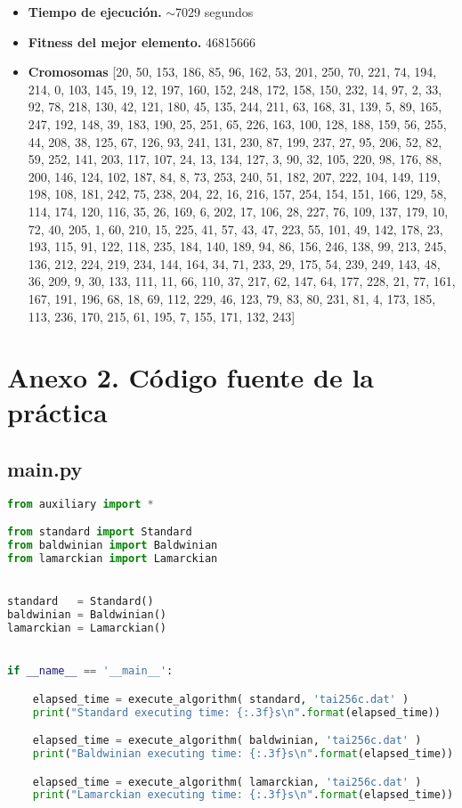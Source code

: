 \begin{itemize}
	\item \textbf{Tiempo de ejecución.} $\sim$7029 segundos
	\item \textbf{Fitness del mejor elemento.} 46815666
	\item \textbf{Cromosomas} [20, 50, 153, 186, 85, 96, 162, 53, 201, 250, 70, 221, 74, 194, 214, 0, 103, 145, 19, 12, 197, 160, 152, 248, 172, 158, 150, 232, 14, 97, 2, 33, 92, 78, 218, 130, 42, 121, 180, 45, 135, 244, 211, 63, 168, 31, 139, 5, 89, 165, 247, 192, 148, 39, 183, 190, 25, 251, 65, 226, 163, 100, 128, 188, 159, 56, 255, 44, 208, 38, 125, 67, 126, 93, 241, 131, 230, 87, 199, 237, 27, 95, 206, 52, 82, 59, 252, 141, 203, 117, 107, 24, 13, 134, 127, 3, 90, 32, 105, 220, 98, 176, 88, 200, 146, 124, 102, 187, 84, 8, 73, 253, 240, 51, 182, 207, 222, 104, 149, 119, 198, 108, 181, 242, 75, 238, 204, 22, 16, 216, 157, 254, 154, 151, 166, 129, 58, 114, 174, 120, 116, 35, 26, 169, 6, 202, 17, 106, 28, 227, 76, 109, 137, 179, 10, 72, 40, 205, 1, 60, 210, 15, 225, 41, 57, 43, 47, 223, 55, 101, 49, 142, 178, 23, 193, 115, 91, 122, 118, 235, 184, 140, 189, 94, 86, 156, 246, 138, 99, 213, 245, 136, 212, 224, 219, 234, 144, 164, 34, 71, 233, 29, 175, 54, 239, 249, 143, 48, 36, 209, 9, 30, 133, 111, 11, 66, 110, 37, 217, 62, 147, 64, 177, 228, 21, 77, 161, 167, 191, 196, 68, 18, 69, 112, 229, 46, 123, 79, 83, 80, 231, 81, 4, 173, 185, 113, 236, 170, 215, 61, 195, 7, 155, 171, 132, 243]

\end{itemize}

\newpage

\section{Anexo 2. Código fuente de la práctica}
\label{anexo:code}

\subsection*{main.py}

\begin{lstlisting}[language=python]
from auxiliary import *

from standard import Standard
from baldwinian import Baldwinian
from lamarckian import Lamarckian


standard   = Standard()
baldwinian = Baldwinian()
lamarckian = Lamarckian()


if __name__ == '__main__':

    elapsed_time = execute_algorithm( standard, 'tai256c.dat' )
    print("Standard executing time: {:.3f}s\n".format(elapsed_time))

    elapsed_time = execute_algorithm( baldwinian, 'tai256c.dat' )
    print("Baldwinian executing time: {:.3f}s\n".format(elapsed_time))

    elapsed_time = execute_algorithm( lamarckian, 'tai256c.dat' )
    print("Lamarckian executing time: {:.3f}s\n".format(elapsed_time))
\end{lstlisting}

